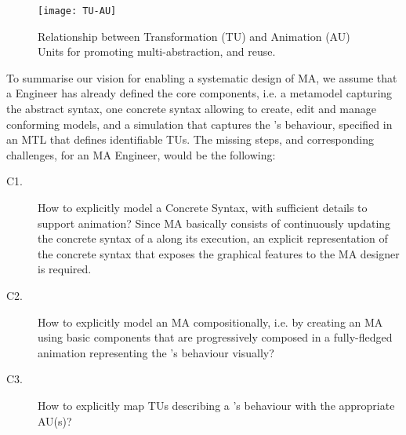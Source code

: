 \begin{figure}[t]%
   \texttt{[image: TU-AU]}%
   \caption{Relationship between Transformation (TU) and Animation (AU) Units for
   promoting multi-abstraction, and reuse.}%
   \label{fig:TU-AU}%
\end{figure}

To summarise our vision for enabling a systematic design of MA, we assume that a 
\DSL Engineer has already defined the core components, i.e. a metamodel capturing
the abstract syntax, one concrete syntax allowing to create, edit and manage 
conforming models, and a simulation that captures the \DSL's behaviour, specified
in an MTL that defines identifiable TUs. The missing steps, and corresponding challenges,
for an MA Engineer, would be the following:

\begin{description}
   \item[C1.] How to explicitly model a Concrete Syntax, with sufficient details
   to support animation? Since MA basically consists of continuously updating the
   concrete syntax of a \DSL along its execution, an explicit representation of the
   concrete syntax that exposes the graphical features to the MA designer is 
   required.
   
   \item[C2.] How to explicitly model an MA compositionally, i.e. by creating an
   MA using basic components that are progressively composed in a fully-fledged
   animation representing the \DSL's behaviour visually? 
   
   \item[C3.] How to explicitly map TUs describing a \DSL's behaviour with the
   appropriate AU(s)? 
\end{description}
